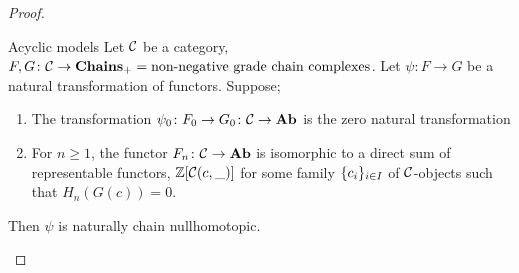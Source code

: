 \documentclass[language=english]{TemplateLecture}
\begin{document}
\begin{proof}
    \begin{thm}{Acyclic models}{}
        Let \(\mathcal{C}\) be a category, \(F,G\colon \mathcal{C} \to \mathbf{Chains}_+ = \text{non-negative grade chain complexes}\). Let \(\psi \colon F \to G\) be a natural transformation of functors. Suppose;
        \begin{enumerate}
            \item The transformation \(\psi_0 \colon F_0 \to G_0 \colon \mathcal{C} \to \mathbf{Ab}\) is the zero natural transformation
            \item For \(n \geq 1\), the functor \(F_n \colon \mathcal{C} \to \mathbf{Ab}\) is isomorphic to a direct sum of representable functors, \(\mathbb{Z}[\mathcal{C}(c,\_)]\) for some family \(\{c_i\}_{i \in I}\) of \(\mathcal{C}\)-objects such that \(H_n(G(c)) = 0\).
        \end{enumerate}
        Then \(\psi\) is naturally chain nullhomotopic.
    \end{thm}
\end{proof}
\end{document}
